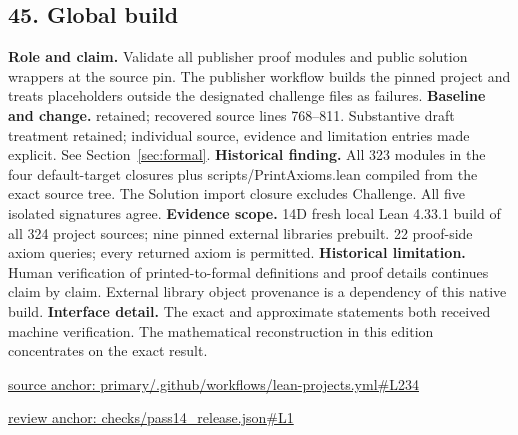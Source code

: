 \documentclass[11pt,letterpaper]{article}
\theoremstyle{definition}\newtheorem{definition}[theorem]{Definition}\newtheorem{example}[theorem]{Example}
\theoremstyle{remark}\newtheorem{remark}[theorem]{Remark}
\begin{document}
\subsection*{45. Global build}
\textbf{Role and claim.} Validate all publisher proof modules and public solution wrappers at the source pin. The publisher workflow builds the pinned project and treats placeholders outside the designated challenge files as failures.
\textbf{Baseline and change.} retained; recovered source lines 768--811. Substantive draft treatment retained; individual source, evidence and limitation entries made explicit. See Section~\ref{sec:formal}.
\textbf{Historical finding.} All 323 modules in the four default-target closures plus scripts/PrintAxioms.lean compiled from the exact source tree. The Solution import closure excludes Challenge. All five isolated signatures agree.
\textbf{Evidence scope.} 14D fresh local Lean 4.33.1 build of all 324 project sources; nine pinned external libraries prebuilt. 22 proof-side axiom queries; every returned axiom is permitted.
\textbf{Historical limitation.} Human verification of printed-to-formal definitions and proof details continues claim by claim. External library object provenance is a dependency of this native build.
\textbf{Interface detail.} The exact and approximate statements both received machine verification. The mathematical reconstruction in this edition concentrates on the exact result.
\par\href{https://github.com/nousentllc/VP-VNP-Review/blob/8a7976933b6b2b4ffda1ad3a0dfb5fc6b6f023e8/primary/.github/workflows/lean-projects.yml\#L234}{source anchor: primary/.github/workflows/lean-projects.yml\#L234}
\par\href{https://github.com/nousentllc/VP-VNP-Review/blob/8a7976933b6b2b4ffda1ad3a0dfb5fc6b6f023e8/checks/pass14_release.json\#L1}{review anchor: checks/pass14\_release.json\#L1}
\goodbreak
\end{document}
